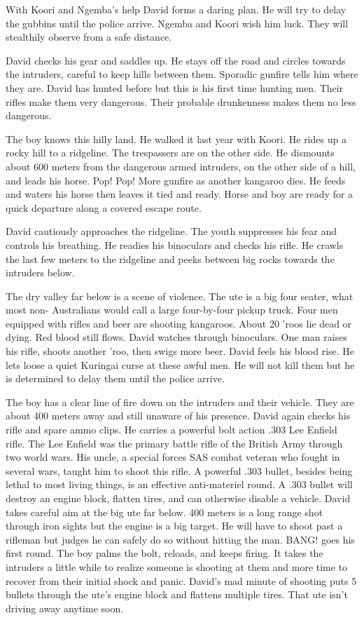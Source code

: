 With Koori and Ngemba's help David forms a daring plan. He will try to delay the gubbins until the police arrive.  Ngemba and Koori wish him luck.  They will stealthily observe from a safe distance.

David checks his gear and saddles up.  He stays off the road and circles towards the intruders, careful to keep hills between them.  Sporadic gunfire tells him where they are.  David has hunted before but this is his first time hunting men.  Their rifles make them very dangerous.  Their probable drunkenness makes them no less dangerous.

The boy knows this hilly land.  He walked it last year with Koori.  He rides up a rocky hill to a ridgeline.  The trespassers are on the other side.  He dismounts about 600 meters from the dangerous armed intruders, on the other side of a hill, and leads his horse. Pop! Pop! More gunfire as another kangaroo dies.   He feeds and waters his horse then leaves it tied and ready. Horse and boy are ready for a quick departure along a covered escape route.

David cautiously approaches the ridgeline.   The youth suppresses his fear and controls his breathing. He readies his binoculars and checks his rifle.  He crawls the last few meters to the ridgeline and peeks between big rocks towards the intruders below.

The dry valley far below is a scene of violence.  The ute is a big four seater, what most non- Australians would call a large four-by-four pickup truck.   Four men equipped with rifles and beer are shooting kangaroos.  About 20 'roos lie dead or dying.  Red blood still flows.  David watches through binoculars.  One man raises his rifle, shoots another 'roo, then swigs more beer.  David feels his blood rise.  He lets loose a quiet Kuringai curse at these awful men. He will not kill them but he is determined to delay them until the police arrive.

The boy has a clear line of fire down on the intruders and their vehicle.  They are about 400 meters away and still unaware of his presence.  David again checks his rifle and spare ammo clips.   He carries a powerful bolt action .303 Lee Enfield rifle. The Lee Enfield was the primary battle rifle of the British Army through two world wars. His uncle, a special forces SAS combat veteran who fought in several wars, taught him to shoot this rifle. A powerful .303 bullet, besides being lethal to most living things, is an effective anti-materiel round.  A .303 bullet will destroy an engine block, flatten tires, and can otherwise disable a vehicle. David takes careful aim at the big ute far below.  400 meters is a long range shot through iron sights but the engine is a big target.  He will have to shoot past a rifleman but judges he can safely do so without hitting the man.  BANG! goes his first round.  The boy palms the bolt, reloads, and keeps firing. It takes the intruders a little while to realize someone is shooting at them and more time to recover from their initial shock and panic.  David's mad minute of shooting puts 5 bullets through the ute's engine block and flattens multiple tires.  That ute isn't driving away anytime soon.

